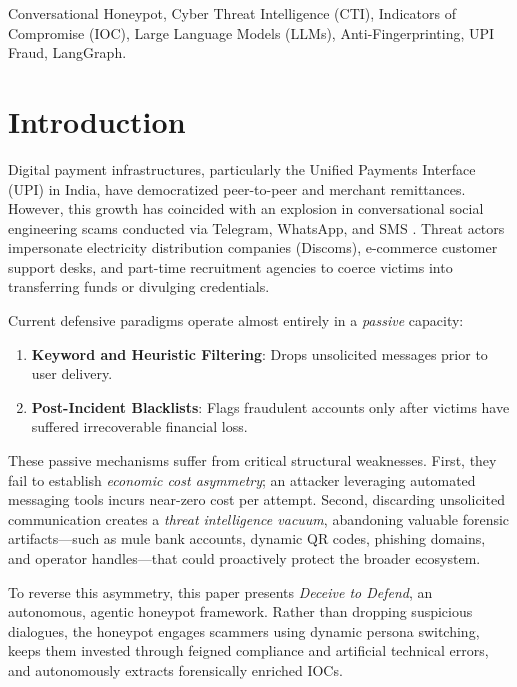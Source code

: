 \documentclass[conference]{IEEEtran}
\begin{document}
\begin{IEEEkeywords}
Conversational Honeypot, Cyber Threat Intelligence (CTI), Indicators of Compromise (IOC), Large Language Models (LLMs), Anti-Fingerprinting, UPI Fraud, LangGraph.
\end{IEEEkeywords}

\section{Introduction}
Digital payment infrastructures, particularly the Unified Payments Interface (UPI) in India, have democratized peer-to-peer and merchant remittances. However, this growth has coincided with an explosion in conversational social engineering scams conducted via Telegram, WhatsApp, and SMS \cite{kumar2023social}. Threat actors impersonate electricity distribution companies (Discoms), e-commerce customer support desks, and part-time recruitment agencies to coerce victims into transferring funds or divulging credentials.

Current defensive paradigms operate almost entirely in a \textit{passive} capacity:
\begin{enumerate}
    \item \textbf{Keyword and Heuristic Filtering}: Drops unsolicited messages prior to user delivery.
    \item \textbf{Post-Incident Blacklists}: Flags fraudulent accounts only after victims have suffered irrecoverable financial loss.
\end{enumerate}

These passive mechanisms suffer from critical structural weaknesses. First, they fail to establish \textit{economic cost asymmetry}; an attacker leveraging automated messaging tools incurs near-zero cost per attempt. Second, discarding unsolicited communication creates a \textit{threat intelligence vacuum}, abandoning valuable forensic artifacts—such as mule bank accounts, dynamic QR codes, phishing domains, and operator handles—that could proactively protect the broader ecosystem.

To reverse this asymmetry, this paper presents \textit{Deceive to Defend}, an autonomous, agentic honeypot framework. Rather than dropping suspicious dialogues, the honeypot engages scammers using dynamic persona switching, keeps them invested through feigned compliance and artificial technical errors, and autonomously extracts forensically enriched IOCs.
\end{document}
